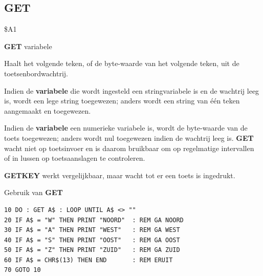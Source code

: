 \subsection{GET}
\begin{description}[leftmargin=2cm,style=nextline]
\item [Token:]    \$A1

\item [Formaat:]   {\bf GET} variabele

\item [Gebruik:]    Haalt het volgende teken, of de byte-waarde van het volgende teken, uit de toetsenbordwachtrij.

                  Indien de {\bf variabele} die wordt ingesteld een stringvariabele is en de wachtrij leeg is, wordt een lege string toegewezen; anders wordt een string van één teken aangemaakt en toegewezen.

                  Indien de {\bf variabele} een numerieke variabele is, wordt de byte-waarde van de toets toegewezen; anders wordt nul toegewezen indien de wachtrij leeg is. {\bf GET} wacht niet op toetsinvoer en is daarom bruikbaar om op regelmatige intervallen of in lussen op toetsaanslagen te controleren.

\item [Opmerkingen:]  {\bf GETKEY} werkt vergelijkbaar, maar wacht tot er een toets is ingedrukt.

\item [Voorbeeld:]  Gebruik van {\bf GET}

\begin{tcolorbox}[colback=black,coltext=white]
\verbatimfont{\codefont}
\begin{verbatim}
10 DO : GET A$ : LOOP UNTIL A$ <> ""
20 IF A$ = "W" THEN PRINT "NOORD"  : REM GA NOORD
30 IF A$ = "A" THEN PRINT "WEST"   : REM GA WEST
40 IF A$ = "S" THEN PRINT "OOST"   : REM GA OOST
50 IF A$ = "Z" THEN PRINT "ZUID"   : REM GA ZUID
60 IF A$ = CHR$(13) THEN END       : REM ERUIT
70 GOTO 10
\end{verbatim}
\end{tcolorbox}
\end{description}


\newpage
